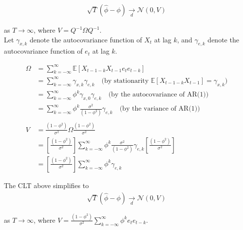 \documentclass[latex/main.tex]{subfiles}
\begin{document}
\begin{align*}
    \sqrt{T}(\hat\phi - \phi) \underset{d}{\to} \mathcal{N}(0, V)
\end{align*}

as $T\to\infty$, where $V = Q^{-1} \Omega Q^{-1}$.\\

Let $\gamma_{x,k}$ denote the autocovariance function of $X_t$ at lag $k$, and $\gamma_{e,k}$ denote the autocovariance function of $e_t$ at lag $k$. 

\begin{align*}
    \Omega &= \sum_{k=-\infty}^\infty \mathbb{E}[X_{t-1-k}X_{t-1}e_te_{t-k}]\\
    &= \sum_{k=-\infty}^\infty \gamma_{x,k} \gamma_{e,k} \quad \text{(by stationarity $\mathbb{E}[X_{t-1-k}X_{t-1}] = \gamma_{x,k}$)}\\
    &= \sum_{k=-\infty}^\infty \phi^k \gamma_{x,0} \gamma_{e,k} \quad \text{(by the autocovariance of AR(1))}\\
    &= \sum_{k=-\infty}^\infty \phi^k \frac{\sigma^2}{(1-\phi^2)} \gamma_{e,k} \quad \text{(by the variance of AR(1))}\\\\
    V &= \frac{(1-\phi^2)}{\sigma^2} \Omega \frac{(1-\phi^2)}{\sigma^2}\\
    &= [\frac{(1-\phi^2)}{\sigma^2}] \sum_{k=-\infty}^\infty \phi^k \frac{\sigma^2}{(1-\phi^2)} \gamma_{e,k} [\frac{(1-\phi^2)}{\sigma^2}]\\
    &= [\frac{(1-\phi^2)}{\sigma^2}] \sum_{k=-\infty}^\infty \phi^k \gamma_{e,k}
\end{align*}

The CLT above simplifies to
\begin{align*}
    \sqrt{T}(\hat\phi - \phi) \underset{d}{\to} \mathcal{N}(0, V)
\end{align*}

as $T\to\infty$, where $V = \frac{(1-\phi^2)}{\sigma^2} \sum_{k=-\infty}^\infty \phi^k e_t e_{t-k}$.\\
\end{document}

